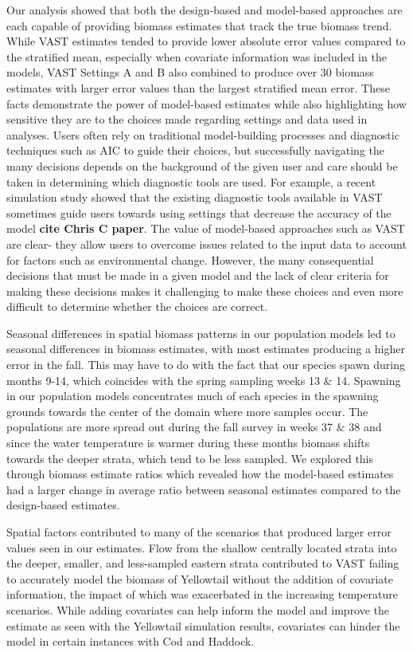 \documentclass[
  12pt,
]{article}
\begin{document}
Our analysis showed that both the design-based and model-based approaches are each capable of providing biomass estimates that track the true biomass trend. While VAST estimates tended to provide lower absolute error values compared to the stratified mean, especially when covariate information was included in the models, VAST Settings A and B also combined to produce over 30 biomass estimates with larger error values than the largest stratified mean error. These facts demonstrate the power of model-based estimates while also highlighting how sensitive they are to the choices made regarding settings and data used in analyses. Users often rely on traditional model-building processes and diagnostic techniques such as AIC to guide their choices, but successfully navigating the many decisions depends on the background of the given user and care should be taken in determining which diagnostic tools are used. For example, a recent simulation study showed that the existing diagnostic tools available in VAST sometimes guide users towards using settings that decrease the accuracy of the model \textbf{cite Chris C paper}. The value of model-based approaches such as VAST are clear- they allow users to overcome issues related to the input data to account for factors such as environmental change. However, the many consequential decisions that must be made in a given model and the lack of clear criteria for making these decisions makes it challenging to make these choices and even more difficult to determine whether the choices are correct.

Seasonal differences in spatial biomass patterns in our population models led to seasonal differences in biomass estimates, with most estimates producing a higher error in the fall. This may have to do with the fact that our species spawn during months 9-14, which coincides with the spring sampling weeks 13 \& 14. Spawning in our population models concentrates much of each species in the spawning grounds towards the center of the domain where more samples occur. The populations are more spread out during the fall survey in weeks 37 \& 38 and since the water temperature is warmer during these months biomass shifts towards the deeper strata, which tend to be less sampled. We explored this through biomass estimate ratios which revealed how the model-based estimates had a larger change in average ratio between seasonal estimates compared to the design-based estimates.

Spatial factors contributed to many of the scenarios that produced larger error values seen in our estimates. Flow from the shallow centrally located strata into the deeper, smaller, and less-sampled eastern strata contributed to VAST failing to accurately model the biomass of Yellowtail without the addition of covariate information, the impact of which was exacerbated in the increasing temperature scenarios. While adding covariates can help inform the model and improve the estimate as seen with the Yellowtail simulation results, covariates can hinder the model in certain instances with Cod and Haddock.
\end{document}
